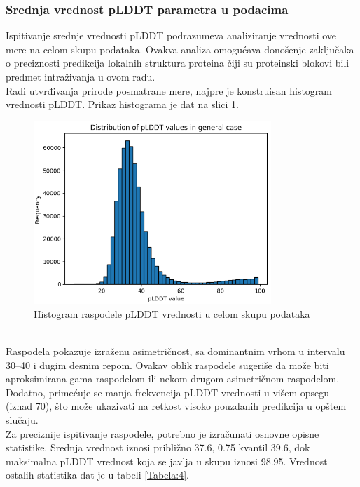 \documentclass[a4paper,12pt]{article}
\begin{document}
\subsubsection{Srednja vrednost pLDDT parametra u podacima}
Ispitivanje srednje vrednosti pLDDT podrazumeva analiziranje vrednosti ove mere na celom skupu podataka. Ovakva analiza omogućava donošenje zaključaka o preciznosti predikcija lokalnih struktura proteina čiji su proteinski blokovi bili predmet intraživanja u ovom radu. \\
Radi utvrđivanja prirode posmatrane mere, najpre je konstruisan histogram vrednosti pLDDT. Prikaz histograma je dat na slici \ref{Slika:distribution}.
\begin{figure}[htbp]
    	\centering
    	\includegraphics[width=0.8\textwidth]{./images/dist_dataset.png}
    	\caption{Histogram raspodele pLDDT vrednosti u celom skupu podataka}
    	\label{Slika:distribution}
\end{figure}
\\
Raspodela pokazuje izraženu asimetričnost, sa dominantnim vrhom u intervalu 30–40 i dugim desnim repom. Ovakav oblik raspodele sugeriše da može biti aproksimirana gama raspodelom ili nekom drugom asimetričnom raspodelom. Dodatno, primećuje se manja frekvencija pLDDT vrednosti u višem opsegu (iznad 70), što može ukazivati na retkost visoko pouzdanih predikcija u opštem slučaju. \\
Za preciznije ispitivanje raspodele, potrebno je izračunati osnovne opisne statistike. Srednja vrednost iznosi približno 37.6, 0.75 kvantil 39.6, dok maksimalna pLDDT vrednost koja se javlja u skupu iznosi 98.95. Vrednost ostalih statistika dat je u tabeli \ref{Tabela:4}.
\end{document}
